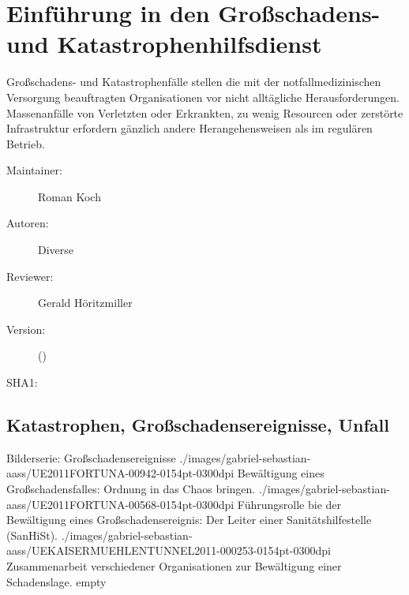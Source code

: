 \def\ChapterCode{KHD}
\chapter
[\CO{[KHD]} Einführung in den Gro{\ss}schadens- und Katastrophenhilfsdienst (.at)]
{Einführung in den Gro{\ss}schadens- und Katastrophenhilfsdienst}
\label{chp:KHD}

\ChapterIntro
{%
Großschadens- und Katastrophenfälle stellen die mit der
notfallmedizinischen Versorgung beauftragten Organisationen
vor nicht alltägliche Herausforderungen. 
Massenanfälle von Verletzten oder Erkrankten, zu wenig
Resourcen oder zerstörte Infrastruktur erfordern gänzlich
andere Herangehensweisen als im regulären Betrieb. 

}
{%
\begin{description}
  \item[Maintainer:] Roman Koch
  \item[Autoren:] Diverse
  \item[Reviewer:] Gerald Höritzmiller
  \item[Version:] {\VarDocVersionTypeName} ({\VarDocVersionTypeDescription})
  \item[SHA1:] {\DocGitCommit}
\end{description}

{\TxTeilkapitelAASS}
}

\section{Katastrophen, Großschadensereignisse, Unfall}



\begin{PictureSeriesWide}{}
{Bilderserie: Großschadensereignisse}
{./images/gabriel-sebastian-aass/UE2011FORTUNA-00942-0154pt-0300dpi}
{Bewältigung eines Großschadensfalles: Ordnung in das Chaos
bringen.}
{./images/gabriel-sebastian-aass/UE2011FORTUNA-00568-0154pt-0300dpi}
{Führungsrolle bie der Bewältigung eines
Großschadensereignis: Der Leiter einer Sanitätshilfestelle (SanHiSt). } {./images/gabriel-sebastian-aass/UEKAISERMUEHLENTUNNEL2011-000253-0154pt-0300dpi}
{Zusammenarbeit verschiedener Organisationen zur Bewältigung einer Schadenslage. }
{empty}
{}
\end{PictureSeriesWide}





